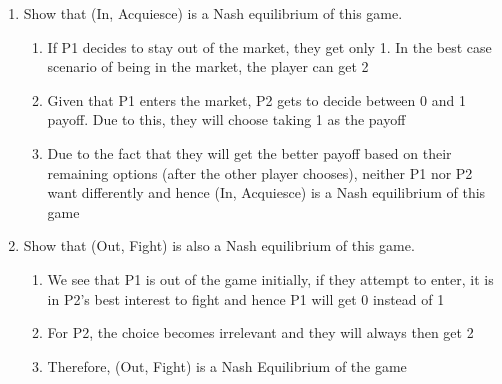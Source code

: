 \documentclass[11pt]{article}
\begin{document}
\begin{enumerate}
\begin{center}
\end{center}

	\begin{enumerate}
	\item Show that (In, Acquiesce) is a Nash equilibrium of this game.
	\begin{enumerate}
        \item If P1 decides to stay out of the market, they get only 1. In the best case scenario of being in the market, the player can get 2
        \item Given that P1 enters the market, P2 gets to decide between 0 and 1 payoff. Due to this, they will choose taking 1 as the payoff
        \item Due to the fact that they will get the better payoff based on their remaining options (after the other player chooses), neither P1 nor P2 want differently and hence (In, Acquiesce) is a Nash equilibrium of this game
    \end{enumerate}
	
	\item Show that (Out, Fight) is also a Nash equilibrium of this game.
	\begin{enumerate}
        \item We see that P1 is out of the game initially, if they attempt to enter, it is in P2's best interest to fight and hence P1 will get 0 instead of 1
        \item For P2, the choice becomes irrelevant and they will always then get 2
        \item Therefore, (Out, Fight) is a Nash Equilibrium of the game
    \end{enumerate}
	


\end{enumerate}
\end{enumerate}
\end{document}
